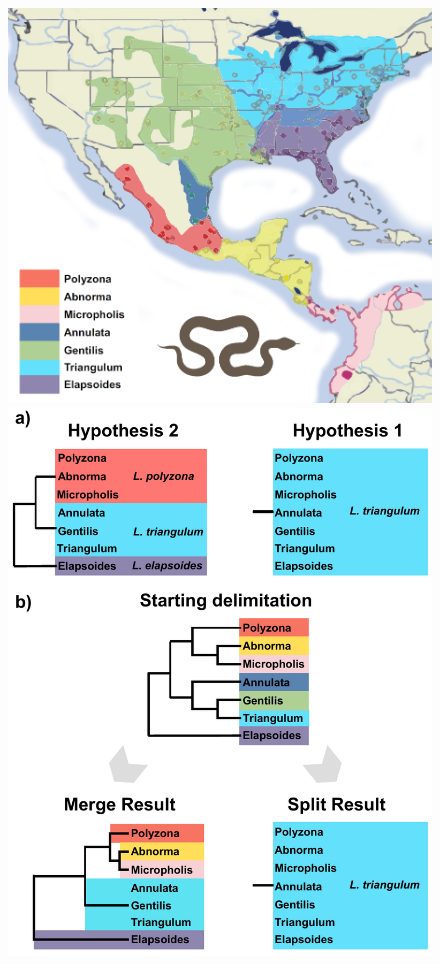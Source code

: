 \documentclass{article1}
\begin{document}
\begin{figure}[h!]
    \centering %
    \includegraphics[scale=0.55]{figs/Lampro/figure} %
    \includegraphics[scale=0.5]{figs/fig-miksnakes-results} %

\end{figure}
\end{document}
